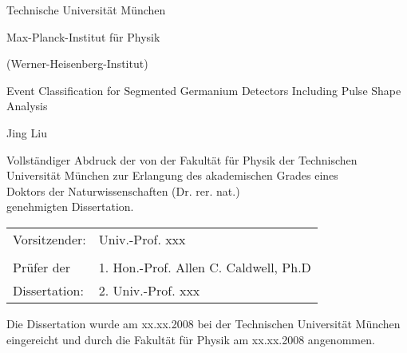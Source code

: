 
\begin{titlepage}

\centering

\vspace{1.0cm}

\Huge Technische Universit\"at M\"unchen

\vspace{1.5 cm}

\Large Max-Planck-Institut f\"ur Physik

\vspace{0.5 cm} 

(Werner-Heisenberg-Institut)

\vspace{1.5 cm}

\huge Event Classification for Segmented Germanium Detectors Including
Pulse Shape Analysis

\vspace{1.5 cm}

\Large Jing Liu

\vspace{1.5 cm}

\normalsize Vollst\"andiger Abdruck der von der Fakult\"at f\"ur
Physik der Technischen Universit\"at M\"unchen zur Erlangung des
akademischen Grades eines \\
Doktors der Naturwissenschaften (Dr. rer. nat.) \\
genehmigten Dissertation. \\

\vspace{1.5 cm} 

\begin{table*}[h]
  \centering
  \begin{tabular}{ll}
    Vorsitzender: & Univ.-Prof. xxx\\ 
    & \\ 
    Pr\"ufer der & 1. Hon.-Prof. Allen C. Caldwell, Ph.D \\ 
    Dissertation: & 2. Univ.-Prof. xxx \\ 
  \end{tabular}
\end{table*}

\vspace{2.0 cm} 

Die Dissertation wurde am xx.xx.2008 bei der Technischen Universit\"at
M\"unchen eingereicht und durch die Fakult\"at f\"ur Physik am
xx.xx.2008 angenommen. \\

\end{titlepage} 

